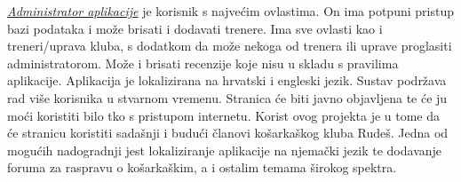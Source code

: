 \bigbreak
\textit{\underline{Administrator  aplikacije} }\textnormal {je korisnik s najvećim ovlastima. On ima potpuni pristup bazi podataka i može brisati i dodavati trenere. Ima
	sve ovlasti kao i treneri/uprava kluba, s dodatkom da može nekoga od trenera ili uprave proglasiti administratorom. Može i brisati 
	recenzije koje nisu u skladu s pravilima aplikacije.}
\bigbreak
\textnormal{Aplikacija je lokalizirana na hrvatski i engleski jezik. Sustav podržava rad više korisnika u stvarnom vremenu.}
\textnormal{Stranica će biti javno objavljena te će ju moći koristiti bilo tko s pristupom internetu.
	Korist ovog projekta je u tome da će stranicu koristiti sadašnji i budući članovi košarkaškog kluba Rudeš. Jedna od mogućih nadogradnji
	jest lokaliziranje aplikacije na njemački jezik te dodavanje foruma za raspravu o košarkaškim, a i ostalim temama širokog spektra.}













